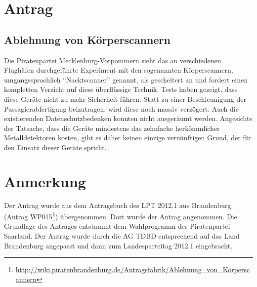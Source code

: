\section{Antrag}

\subsection{Ablehnung von Körperscannern}

Die Piratenpartei Mecklenburg-Vorpommern sieht das an verschiedenen Flughäfen durchgeführte Experiment mit den sogenannten Körperscannern, umgangssprachlich ``Nacktscanner'' genannt, als gescheitert an und fordert einen kompletten Verzicht auf diese überflüssige Technik. Tests haben gezeigt, dass diese Geräte nicht zu mehr Sicherheit führen. Statt zu einer Beschleunigung der Passagierabfertigung beizutragen, wird diese noch massiv verzögert. Auch die existierenden Datenschutzbedenken konnten nicht ausgeräumt werden. Angesichts der Tatsache, dass die Geräte mindestens das zehnfache herkömmlicher Metalldetektoren kosten, gibt es daher keinen einzige vernünftigen Grund, der für den Einsatz dieser Geräte spricht.

\section{Anmerkung}

Der Antrag wurde aus dem Antragsbuch des LPT 2012.1 aus Brandenburg (Antrag WP015\footnote{\url{http://wiki.piratenbrandenburg.de/Antragsfabrik/Ablehnung\_von\_Körperscannern}}) übergenommen. Dort wurde der Antrag angenommen. Die Grundlage des Antrages entstammt dem Wahlprogramm der Piratenpartei Saarland. Der Antrag wurde durch die AG TDBD entsprechend auf das Land Brandenburg angepasst und dann zum Landesparteitag 2012.1 eingebracht.
